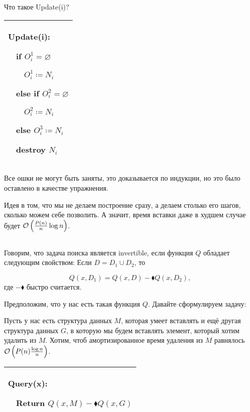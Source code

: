 Что такое Update(i)?


\begin{tabular}{|p{3cm}|}
	\hline
	Update(i):

	$\quad$if $O^1_i = \varnothing$

	$\quad$$\quad$$O^1_i \coloneqq N_i$

	$\quad$else if $O_i^2 = \varnothing$

	$\quad$$\quad$$O_i^2 \coloneqq N_i$

	$\quad$else $O_i^3 \coloneqq N_i$

	$\quad$destroy $N_i$ \\

	\hline
\end{tabular}


Все ошки не могут быть заняты, это доказывается по индукции, но это было оставлено в качестве упражнения.

Идея в том, что мы не делаем построение сразу, а делаем столько его шагов, сколько можем себе позволить. А значит, время вставки даже в худшем случае будет $\mathcal{O}\left(\frac{P(n)}{n}\log n\right)$.

\subsection{}

\begin{definition}
	Говорим, что задача поиска является invertible, если функция $Q$ обладает следующим свойством:
	Если $D = D_1 \cup D_2$, то

	\begin{equation*}
		Q(x, D_1) = Q(x, D) - \blacklozenge Q(x, D_2),
	\end{equation*}
	где $- \blacklozenge$ быстро считается.
\end{definition}

Предположим, что у нас есть такая функция $Q$. Давайте сформулируем задачу:


\begin{task}
	Пусть у нас есть структура данных $M$, которая умеет вставлять и ещё другая структура данных $G$, в которую мы будем вставлять элемент, который хотим удалить из $M$. Хотим, чтоб амортизированное время удаления из $M$ равнялось $\mathcal{O}\left(P(n)\frac{\log n}{n}\right)$.
\end{task}


\begin{tabular}{|p{5cm}|}
	\hline
	Query(x):

	$\quad$Return $Q(x, M) - \blacklozenge Q(x, G)$ \\
	\hline
\end{tabular}


